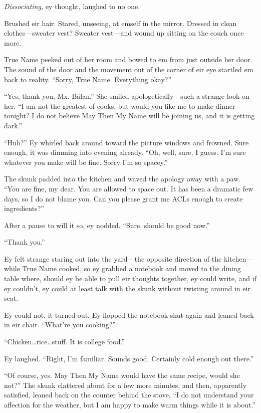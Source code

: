 \emph{Dissociating,} ey thought, laughed to no one.

Brushed eir hair. Stared, unseeing, at emself in the mirror. Dressed in clean clothes—sweater vest? Sweater vest—and wound up sitting on the couch once more.

True Name peeked out of her room and bowed to em from just outside her door. The sound of the door and the movement out of the corner of eir eye startled em back to reality. ``Sorry, True Name. Everything okay?''

``Yes, thank you, Mx. Bălan.'' She smiled apologetically—such a strange look on her. ``I am not the greatest of cooks, but would you like me to make dinner tonight? I do not believe May Then My Name will be joining us, and it is getting dark.''

``Huh?'' Ey whirled back around toward the picture windows and frowned. Sure enough, it was dimming into evening already. ``Oh, well, sure, I guess. I'm sure whatever you make will be fine. Sorry I'm so spacey.''

The skunk padded into the kitchen and waved the apology away with a paw. ``You are fine, my dear. You are allowed to space out. It has been a dramatic few days, so I do not blame you. Can you please grant me ACLs enough to create ingredients?''

After a pause to will it so, ey nodded. ``Sure, should be good now.''

``Thank you.''

Ey felt strange staring out into the yard—the opposite direction of the kitchen—while True Name cooked, so ey grabbed a notebook and moved to the dining table where, should ey be able to pull eir thoughts together, ey could write, and if ey couldn't, ey could at least talk with the skunk without twisting around in eir seat.

Ey could not, it turned out. Ey flopped the notebook shut again and leaned back in eir chair. ``What're you cooking?''

``Chicken\ldots rice\ldots stuff. It is college food.''

Ey laughed. ``Right, I'm familiar. Sounds good. Certainly cold enough out there.''

``Of course, yes. May Then My Name would have the same recipe, would she not?'' The skunk clattered about for a few more minutes, and then, apparently satisfied, leaned back on the counter behind the stove. ``I do not understand your affection for the weather, but I am happy to make warm things while it is about.''

